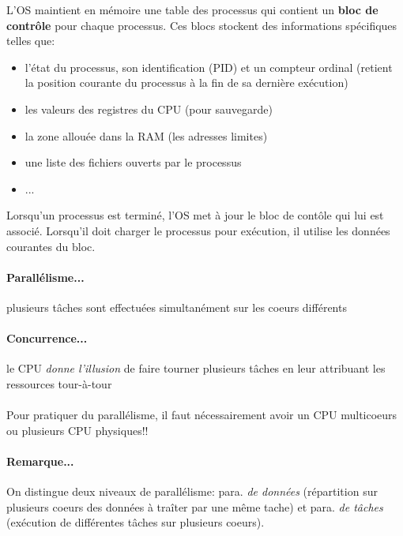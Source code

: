\item{}
{
L'OS maintient en mémoire une table des processus qui contient un \textbf{bloc de contrôle} pour chaque processus.
Ces blocs stockent des informations spécifiques telles que:
\begin{itemize}
\item l'état du processus, son identification (PID) et un compteur ordinal (retient la position courante du processus à la fin de sa dernière exécution)
\item les valeurs des registres du CPU (pour sauvegarde)
\item la zone allouée dans la RAM (les adresses limites)
\item une liste des fichiers ouverts par le processus
\item ...
\end{itemize}

Lorsqu'un processus est terminé, l'OS met à jour le bloc de contôle qui lui est associé. Lorsqu'il doit charger le processus pour exécution, il utilise les données courantes du bloc.
}


\item{}
{
\paragraph{Parallélisme...} plusieurs tâches sont effectuées simultanément sur les coeurs différents
\paragraph{Concurrence...} le CPU \textit{donne l'illusion} de faire tourner plusieurs tâches en leur attribuant les ressources tour-à-tour

\paragraph{}
Pour pratiquer du parallélisme, il faut nécessairement avoir un CPU multicoeurs ou plusieurs CPU physiques!!

\paragraph{Remarque...} On distingue deux niveaux de parallélisme: para. \textit{de données} (répartition sur plusieurs coeurs des données à traîter par une même tache) et para. \textit{de tâches} (exécution de différentes tâches sur plusieurs coeurs).
}


